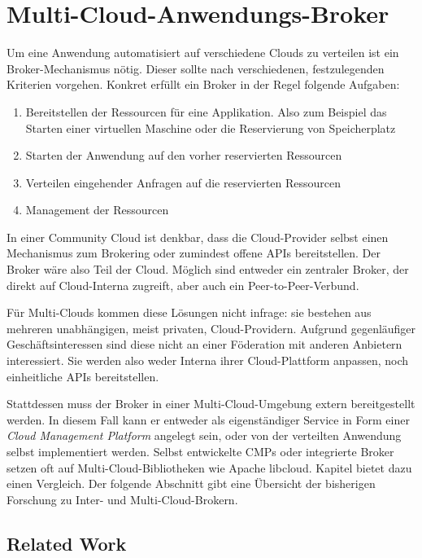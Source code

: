 \chapter{Multi-Cloud-Anwendungs-Broker}

Um eine Anwendung automatisiert auf verschiedene Clouds zu verteilen ist ein Broker-Mechanismus nötig. Dieser sollte nach verschiedenen, festzulegenden Kriterien vorgehen. Konkret erfüllt ein Broker in der Regel folgende Aufgaben:

\begin{enumerate}
	\item Bereitstellen der Ressourcen für eine Applikation. Also zum Beispiel das Starten einer virtuellen Maschine oder die Reservierung von Speicherplatz
	\item Starten der Anwendung auf den vorher reservierten Ressourcen
	\item Verteilen eingehender Anfragen auf die reservierten Ressourcen
	\item Management der Ressourcen
\end{enumerate}

\noindent In einer Community Cloud ist denkbar, dass die Cloud-Provider selbst einen Mechanismus zum Brokering oder zumindest offene APIs bereitstellen. Der Broker wäre also Teil der Cloud. Möglich sind entweder ein zentraler Broker, der direkt auf Cloud-Interna zugreift, aber auch ein Peer-to-Peer-Verbund.

Für Multi-Clouds kommen diese Lösungen nicht infrage: sie bestehen aus mehreren unabhängigen, meist privaten, Cloud-Providern. Aufgrund gegenläufiger Geschäftsinteressen sind diese nicht an einer Föderation mit anderen Anbietern interessiert. Sie werden also weder Interna ihrer Cloud-Plattform anpassen, noch einheitliche APIs bereitstellen.

Stattdessen muss der Broker in einer Multi-Cloud-Umgebung extern bereitgestellt werden. In diesem Fall kann er entweder als eigenständiger Service in Form einer \emph{Cloud Management Platform} angelegt sein, oder von der verteilten Anwendung selbst implementiert werden. Selbst entwickelte CMPs oder integrierte Broker setzen oft auf Multi-Cloud-Bibliotheken wie Apache libcloud. Kapitel  bietet dazu einen Vergleich. Der folgende Abschnitt gibt eine Übersicht der bisherigen Forschung zu Inter- und Multi-Cloud-Brokern.

\section{Related Work}

